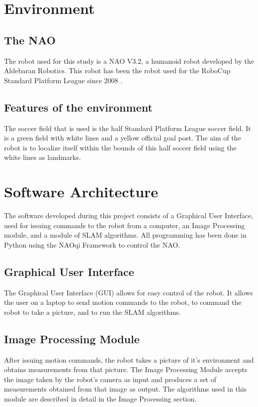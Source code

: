 \documentclass{ba-kecs}
\numberwithin{figure}{section}
\numberwithin{equation}{section}
\begin{document}

\section{Environment}
\subsection{The NAO}

The robot used for this study is a NAO V3.2, a humanoid robot developed by the Aldebaran Robotics. This robot has been the robot used for the RoboCup Standard Platform League since 2008 \cite{cd2}. 


\subsection{Features of the environment}
The soccer field that is used is the half Standard Platform League soccer field. It is a green field with white lines and a yellow official goal post. The aim of the robot is to localize itself within the bounds of this half soccer field using the white lines as landmarks.


\section{Software Architecture}
The software developed during this project consists of a Graphical User Interface, used for issuing commands to the robot from a computer, an Image Processing module, and a module of SLAM algorithms. All programming has been done in Python using the NAOqi Framework to control the NAO.

\subsection{Graphical User Interface}
The Graphical User Interface (GUI) allows for easy control of the robot. It allows the user on a laptop to send motion commands to the robot, to command the robot to take a picture, and to run the SLAM algorithms.

\subsection{Image Processing Module}
After issuing motion commands, the robot takes a picture of it's environment and obtains measurements from that picture. The Image Processing Module accepts the image taken by the robot's camera as input and produces a set of measurements obtained from that image as output. The algorithms used in this module are described in detail in the Image Processing section.
\end{document}
